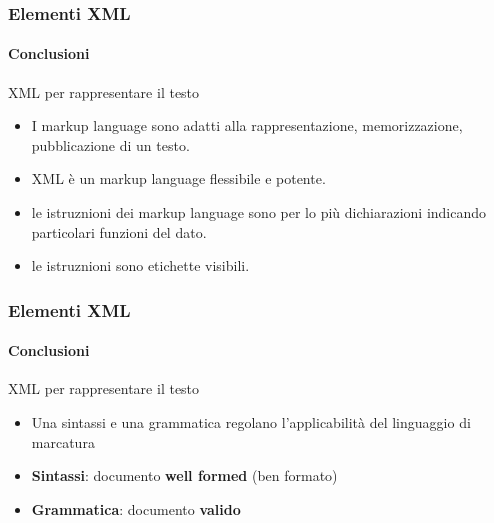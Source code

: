 \begin{frame}
    \frametitle{Elementi XML}
    \framesubtitle{Conclusioni}
    \addtocounter{nframe}{1}

    \begin{block}{XML per rappresentare il testo}
        \begin{itemize}
            \item I markup language sono adatti alla rappresentazione, memorizzazione, pubblicazione di un testo.
            \item XML è un markup language flessibile e potente.
        \end{itemize}

        \begin{itemize}
            \item le istruznioni dei markup language sono per lo più dichiarazioni indicando particolari funzioni del dato.
            \item le istruznioni sono etichette visibili.
        \end{itemize}
        
    \end{block}

\end{frame}

\begin{frame}
    \frametitle{Elementi XML}
    \framesubtitle{Conclusioni}
    \addtocounter{nframe}{1}

    \begin{block}{XML per rappresentare il testo}
        \begin{itemize}
            \item Una sintassi e una grammatica regolano l'applicabilità del linguaggio di marcatura
            \item \textbf{Sintassi}: documento \textbf{well formed} (ben formato)
            \item \textbf{Grammatica}: documento \textbf{valido}
        \end{itemize}

    \end{block}

\end{frame}



